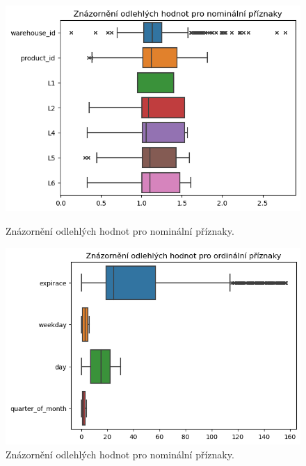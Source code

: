 \begin{figure}[hbtp!]
    \centering
    \begin{minipage}{.5\textwidth}
        \centering
        \captionsetup{justification=centering}
        
        \includegraphics[width=.96\textwidth]{obrazky/zntb/box_nominal.png}
        \caption{Znázornění odlehlých hodnot pro nominální příznaky.}
        \label{obr:rok:g:outlierN}
    \end{minipage}%
    \begin{minipage}{.5\textwidth}
        \centering
        \captionsetup{justification=centering}

        \includegraphics[width=.98\textwidth]{obrazky/zntb/box_ordinal.png}
        \caption{Znázornění odlehlých hodnot pro nominální příznaky.}
        \label{obr:rok:g:outlierO}
    \end{minipage}
\end{figure}

